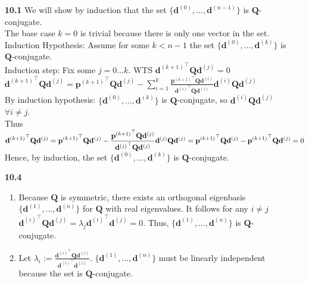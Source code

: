 \documentclass[10pt]{article}
\begin{document}
\begin{enumerate}
    \item [\textbf{10.1}] We will show by induction that the set $\{\mathbf{d}^{(0)},\ldots,\mathbf{d}^{(n-1)}\}$ is $\mathbf{Q}$-conjugate.\\
    The base case $k=0$ is trivial because there is only one vector in the set.\\
    Induction Hypothesis: Assume for some $k<n-1$ the set $\{\mathbf{d}^{(0)},\ldots,\mathbf{d}^{(k)}\}$ is $\mathbf{Q}$-conjugate.\\
    Induction step: Fix some $j=0\ldots k$. WTS ${\mathbf{d}^{(k+1)}}^\top\mathbf{Q}\mathbf{d}^{(j)}=0$\\
    $\displaystyle{\mathbf{d}^{(k+1)}}^\top\mathbf{Q}\mathbf{d}^{(j)}={\mathbf{p}^{(k+1)}}^\top\mathbf{Q}\mathbf{d}^{(j)}-\sum_{i=1}^{k}\frac{{\mathbf{p}^{(k+1)}}^\top\mathbf{Q}\mathbf{d}^{(i)}}{{\mathbf{d}^{(i)}}^\top\mathbf{Q}\mathbf{d}^{(i)}}\mathbf{d}^{(i)}\mathbf{Q}\mathbf{d}^{(j)}$\\
    By induction hypothesis: $\{\mathbf{d}^{(0)},\ldots,\mathbf{d}^{(k)}\}$ is $\mathbf{Q}$-conjugate, so $\mathbf{d}^{(i)}\mathbf{Q}\mathbf{d}^{(j)}$ $\forall i\neq j$.\\
    Thus $\displaystyle{\mathbf{d}^{(k+1)}}^\top\mathbf{Q}\mathbf{d}^{(j)}={\mathbf{p}^{(k+1)}}^\top\mathbf{Q}\mathbf{d}^{(j)}-\frac{{\mathbf{p}^{(k+1)}}^\top\mathbf{Q}\mathbf{d}^{(j)}}{{\mathbf{d}^{(j)}}^\top\mathbf{Q}\mathbf{d}^{(j)}}\mathbf{d}^{(j)}\mathbf{Q}\mathbf{d}^{(j)}\\
    ={\mathbf{p}^{(k+1)}}^\top\mathbf{Q}\mathbf{d}^{(j)}-{\mathbf{p}^{(k+1)}}^\top\mathbf{Q}\mathbf{d}^{(j)}=0$\\
    Hence, by induction, the set $\{\mathbf{d}^{(0)},\ldots,\mathbf{d}^{(k)}\}$ is $\mathbf{Q}$-conjugate.
    \item [\textbf{10.4}]\begin{enumerate}
        \item Because $\mathbf{Q}$ is symmetric, there exists an orthogonal eigenbasis $\{\mathbf{d}^{(1)},\ldots,\mathbf{d}^{(n)}\}$ for $\mathbf{Q}$ with real eigenvalues.
        It follows for any $i\neq j$ ${\mathbf{d}^{(i)}}^\top\mathbf{Q}\mathbf{d}^{(j)}=\lambda_j {\mathbf{d}^{(i)}}^\top\mathbf{d}^{(j)}=0$. Thus, $\{\mathbf{d}^{(1)},\ldots,\mathbf{d}^{(n)}\}$ is $\mathbf{Q}$-conjugate.
        \item Let $\lambda_i:=\frac{{\mathbf{d}^{(i)}}^\top\mathbf{Q}\mathbf{d}^{(i)}}{{\mathbf{d}^{(i)}}^\top \mathbf{d}^{(i)}}$. 
        $\{\mathbf{d}^{(1)},\ldots,\mathbf{d}^{(n)}\}$ must be linearly independent because the set is $\mathbf{Q}$-conjugate. 

\end{enumerate}
\end{enumerate}
\end{document}
